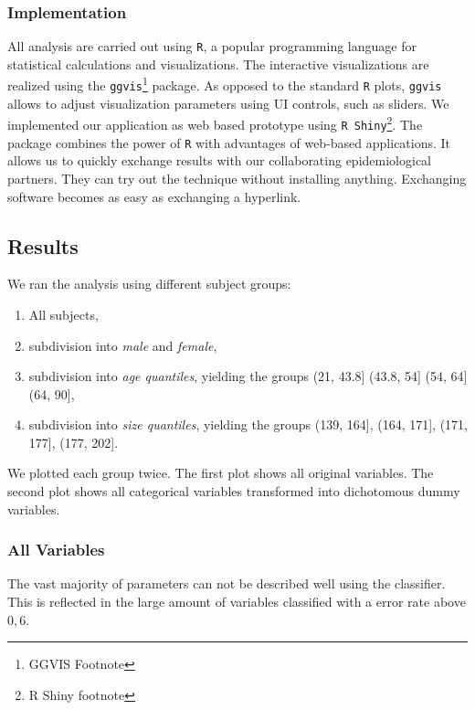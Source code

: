 \documentclass[a4paper,twoside]{style/article}
\begin{document}
\subsubsection{Implementation}
All analysis are carried out using \texttt{R}, a popular programming language for statistical calculations and visualizations.
The interactive visualizations are realized using the \texttt{ggvis}\footnote{GGVIS Footnote} package.
As opposed to the standard \texttt{R} plots, \texttt{ggvis} allows to adjust visualization parameters using UI controls, such as sliders.
We implemented our application as web based prototype using \texttt{R Shiny}\footnote{R Shiny footnote}.
The package combines the power of \texttt{R} with advantages of web-based applications.
It allows us to quickly exchange results with our collaborating epidemiological partners.
They can try out the technique without installing anything.
Exchanging software becomes as easy as exchanging a hyperlink.
\subsection{Results}
We ran the analysis using different subject groups:
\begin{enumerate}
	\item All subjects,
	\item subdivision into \emph{male} and \emph{female},
	\item subdivision into \emph{age quantiles}, yielding the groups (21, 43.8] (43.8, 54] (54, 64] (64, 90],
	\item subdivision into \emph{size quantiles}, yielding the groups (139, 164], (164, 171], (171, 177], (177, 202].
\end{enumerate}
We plotted each group twice.
The first plot shows all original variables.
The second plot shows all categorical variables transformed into dichotomous dummy variables.

\subsubsection{All Variables}
The vast majority of parameters can not be described well using the classifier.
This is reflected in the large amount of variables classified with a error rate above $0,6$.
\end{document}
